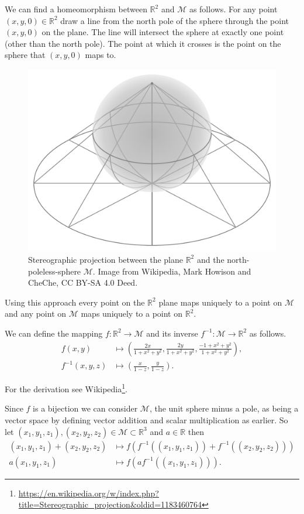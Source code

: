 \documentclass[10pt, a4paper]{article}
\def\R{\mathbb{R}}
\def\f{f}
\def\finv{f^{-1}}
\theoremstyle{break}
\begin{document}
We can find a homeomorphism between $\R^2$ and $\mathscr{M}$ as follows. For any point $(x, y, 0) \in \R^2$ draw a line from the north pole of the sphere through the point $(x, y, 0)$ on the plane. The line will intersect the sphere at exactly one point (other than the north pole). The point at which it crosses is the point on the sphere that $(x, y, 0)$ maps to.

\begin{figure}[h!]
\centering
\includegraphics[width=0.5\linewidth]{./figures/stereoproj.pdf}
\caption[Stereographic projection]{Stereographic projection between the plane $\R^2$ and the north-poleless-sphere $\mathscr{M}$. Image from Wikipedia, Mark Howison and CheChe, CC BY-SA 4.0 Deed\footnotemark[2].}
\label{fig:stereoproj}
\end{figure}


Using this approach every point on the $\R^2$ plane maps uniquely to a point on $\mathscr{M}$ and any point on $\mathscr{M}$ maps uniquely to a point on $\R^2$.

We can define the mapping $\f : \R^2 \to \mathscr{M}$ and its inverse $\finv : \mathscr{M} \to \R^2$ as follows.
\begin{align*}
\f (x, y) & \mapsto \left( \frac{2x}{1 + x^2 + y^2}, \frac{2y}{1 + x^2 + y^2}, \frac{-1 + x^2 + y^2}{1 + x^2 + y^2} \right), \\
\finv (x, y, z) & \mapsto \left( \frac{x}{1 - z}, \frac{y}{1 - z} \right).
\end{align*}

For the derivation see Wikipedia\footnote[3]{\url{https://en.wikipedia.org/w/index.php?title=Stereographic_projection&oldid=1183460764}}.

Since $\f$ is a bijection we can consider $\mathscr{M}$, the unit sphere minus a pole, as being a vector space by defining vector addition and scalar multiplication as earlier. So let $(x_1, y_1, z_1), (x_2, y_2, z_2) \in \mathscr{M} \subset \R^3$ and $a \in \R$ then
\begin{align*}
(x_1, y_1, z_1) + (x_2, y_2, z_2) & \mapsto \f( \finv((x_1, y_1, z_1)) + \finv((x_2, y_2, z_2))) \\
a (x_1, y_1, z_1) & \mapsto \f( a \finv ((x_1, y_1, z_1))).
\end{align*}
\end{document}
